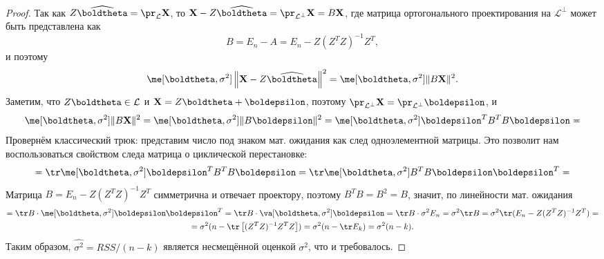 \begin{proof}
    Так как $Z\widehat \boldtheta = \pr_{\mathcal{L}} \mathbf X$, то $\mathbf X - Z\widehat \boldtheta = \pr_{\mathcal{L}^{\bot}} \mathbf X = B\mathbf X$, где матрица ортогонального проектирования на $\mathcal{L}^{\bot}$ может быть представлена как
    \[
    B = E_n - A = E_n - Z(Z^T Z)^{-1} Z^T,
    \]
    и поэтому
    \[
    \me[\boldtheta, \sigma^2] \left\|\mathbf X - Z\widehat \boldtheta\right\|^2 = \me[\boldtheta, \sigma^2]\|B\mathbf X\|^2.
    \]
    Заметим, что $Z\boldtheta \in \mathcal{L}$ и $\mathbf X = Z\boldtheta + \boldepsilon$, поэтому $\pr_{\mathcal{L}^{\bot}} \mathbf X = \pr_{\mathcal{L}^{\bot}} \boldepsilon$, и
    \[
    \me[\boldtheta, \sigma^2]\|B\mathbf X\|^2 = \me[\boldtheta, \sigma^2] \|B
    \boldepsilon\|^2 = \me[\boldtheta, \sigma^2] \boldepsilon^T B^T B \boldepsilon \eqcirc
    \]
    Провернём классический трюк: представим число под знаком мат. ожидания как след одноэлементной матрицы. Это позволит нам воспользоваться свойством следа матрица о циклической перестановке:
    \[
    \eqcirc \tr \me[\boldtheta, \sigma^2] \boldepsilon^T B^T B \boldepsilon = \tr \me[\boldtheta, \sigma^2] B^T B \boldepsilon \boldepsilon^T \eqcirc
    \]
    Матрица $B = E_n - Z(Z^T Z)^{-1} Z^T$ симметрична и отвечает проектору, поэтому $B^TB = B^2 = B$, значит, по линейности мат. ожидания
    \begin{gather*}
        \eqcirc \tr B \cdot \me[\boldtheta, \sigma^2] \boldepsilon \boldepsilon^T = \tr B \cdot \va[\boldtheta, \sigma^2] \boldepsilon = \tr B \cdot \sigma^2 E_n = \sigma^2 \tr B = \sigma^2 \tr (E_n - Z(Z^T Z)^{-1} Z^T) = \\
        = \sigma^2(n - \tr\left[ (Z^T Z)^{-1} Z^TZ\right]) = \sigma^2(n - \tr E_k) = \sigma^2(n-k).
    \end{gather*}
    Таким образом, $\widehat{\sigma^2} = RSS/(n-k)$ является несмещённой оценкой $\sigma^2$, что и требовалось.
\end{proof}


